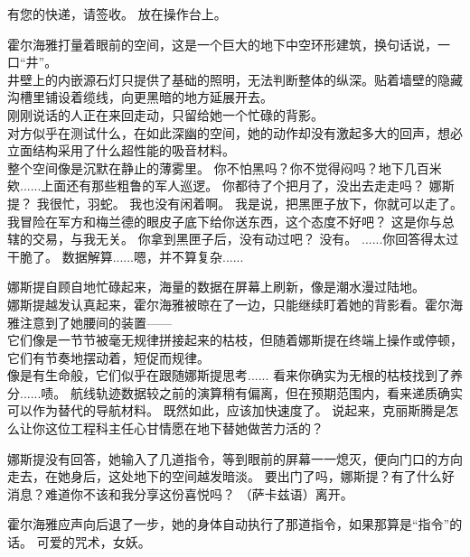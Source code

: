 \documentclass[openany]{book}
\begin{document}
\begin{dialogue}
     有您的快递，请签收。
     放在操作台上。\par
    霍尔海雅打量着眼前的空间，这是一个巨大的地下中空环形建筑，换句话说，一口“井”。\\
    井壁上的内嵌源石灯只提供了基础的照明，无法判断整体的纵深。贴着墙壁的隐藏沟槽里铺设着缆线，向更黑暗的地方延展开去。\\
    刚刚说话的人正在来回走动，只留给她一个忙碌的背影。\\
    对方似乎在测试什么，在如此深幽的空间，她的动作却没有激起多大的回声，想必立面结构采用了什么超性能的吸音材料。\\
    整个空间像是沉默在静止的薄雾里。
     你不怕黑吗？你不觉得闷吗？地下几百米欸......上面还有那些粗鲁的军人巡逻。
     你都待了个把月了，没出去走走吗？
     娜斯提？
     我很忙，羽蛇。
     我也没有闲着啊。
     我是说，把黑匣子放下，你就可以走了。
     我冒险在军方和梅兰德的眼皮子底下给你送东西，这个态度不好吧？
     这是你与总辖的交易，与我无关。
     你拿到黑匣子后，没有动过吧？
     没有。
     ......你回答得太过干脆了。
     数据解算......嗯，并不算复杂......\par
    娜斯提自顾自地忙碌起来，海量的数据在屏幕上刷新，像是潮水漫过陆地。\\
    娜斯提越发认真起来，霍尔海雅被晾在了一边，只能继续盯着她的背影看。霍尔海雅注意到了她腰间的装置——\\
    它们像是一节节被毫无规律拼接起来的枯枝，但随着娜斯提在终端上操作或停顿，它们有节奏地摆动着，短促而规律。\\
    像是有生命般，它们似乎在跟随娜斯提思考......
     看来你确实为无根的枯枝找到了养分......啧。
     航线轨迹数据较之前的演算稍有偏离，但在预期范围内，看来递质确实可以作为替代的导航材料。
     既然如此，应该加快速度了。
     说起来，克丽斯腾是怎么让你这位工程科主任心甘情愿在地下替她做苦力活的？\par
    娜斯提没有回答，她输入了几道指令，等到眼前的屏幕一一熄灭，便向门口的方向走去，在她身后，这处地下的空间越发暗淡。
     要出门了吗，娜斯提？有了什么好消息？难道你不该和我分享这份喜悦吗？
     （萨卡兹语）离开。\par
    霍尔海雅应声向后退了一步，她的身体自动执行了那道指令，如果那算是“指令”的话。
     可爱的咒术，女妖。

\end{dialogue}
\end{document}
